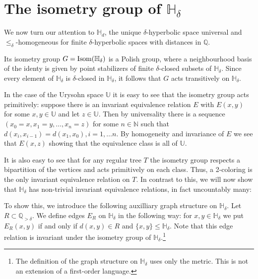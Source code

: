 \documentclass{amsart}
\renewcommand{\d}{\delta}
\renewcommand{\H}{\mathbb{H}}
\newcommand{\Q}{\mathbb{Q}}
\def\Isom{\mathop{\rm Isom}\nolimits}
\begin{document}
\section{The isometry group of $\H_\d$}\label{sec:isomgroup}


We now turn our attention to $\H_d$, the unique $\d$-hyperbolic space universal and $\leq_\d$-homogeneous for finite $\d$-hyperbolic spaces with distances in $\Q$.

Its isometry group $G=\Isom(\H_\d)$ is a Polish group, where a neighbourhood basis of the identy is given by point stabilizers of finite   $\d$-closed subsets of $\H_\d$. Since every element of $\H_\d$ is   $\d$-closed in $\H_\d$, it follows that $G$ acts transitively on $\H_\d$.


In the case of the Urysohn space $\mathbb{U}$ it is easy to see that the isometry group acts primitively: suppose there is an invariant equivalence relation $E$ with $E(x,y)$ for some $x,y\in\mathbb{U}$ and let $z\in\mathbb{U}$. Then by universality there is a sequence $(x_0=x,x_1=y,\ldots, x_n=z)$ for some $n\in\mathbb{N}$ such that $d(x_i,x_{i-1})=d(x_1,x_0), i=1,\ldots n$. By homogeneity and invariance of $E$ we see that $E(x,z)$ showing that the equivalence class is all of $\mathbb{U}$.

It is also easy to see that for any regular tree $T$ the isometry group respects a bipartition of the vertices and acts primitively on each class. Thus, a 2-coloring is the only invariant equivalence relation on $T$.
In contrast to this, we will now show that $\H_\d$ has non-trivial invariant equivalence relations, in fact uncountably many:

To show this, we introduce the following auxilliary graph structure on $\H_\d$. Let $R\subset\mathbb{Q}_{> \d}$. We define edges $E_R$ on $\H_\d$ in the following way: for $x,y\in\H_\d$ we put $E_R(x,y)$ if and only if $d(x,y)\in R$ and $\{x,y\}\leq \H_\d$.
Note that this edge relation is invariant under the isometry group of $\H_\d$.\footnote{The definition of the graph structure on $\H_\d$ uses only the metric. This is not an extension of a first-order language.}
\end{document}
